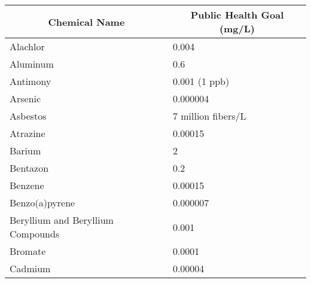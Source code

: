 \begin{table}[!htbp]
\begin{tabular}{|m{9cm}|m{5cm}|}
\hline
\multicolumn{1}{|c|}{\textbf{Chemical Name}}                        & \multicolumn{1}{c|}{\textbf{Public Health Goal (mg/L)}} \\ \hline
Alachlor                                                            & 0.004                                                   \\ \hline
Aluminum                                                            & 0.6                                                     \\ \hline
Antimony                                                            & 0.001 (1 ppb)                                           \\ \hline
Arsenic                                                             & 0.000004                                                \\ \hline
Asbestos                                                            & 7 million   fibers/L                                    \\ \hline
Atrazine                                                            & 0.00015                                                 \\ \hline
Barium                                                              & 2                                                       \\ \hline
Bentazon                                                            & 0.2                                                     \\ \hline
Benzene                                                             & 0.00015                                                 \\ \hline
Benzo(a)pyrene                                                      & 0.000007                                                \\ \hline
Beryllium and Beryllium Compounds                                   & 0.001                                                   \\ \hline
Bromate                                                             & 0.0001                                                  \\ \hline
Cadmium                                                             & 0.00004                                                 \\ \hline

\end{tabular}
\end{table}
